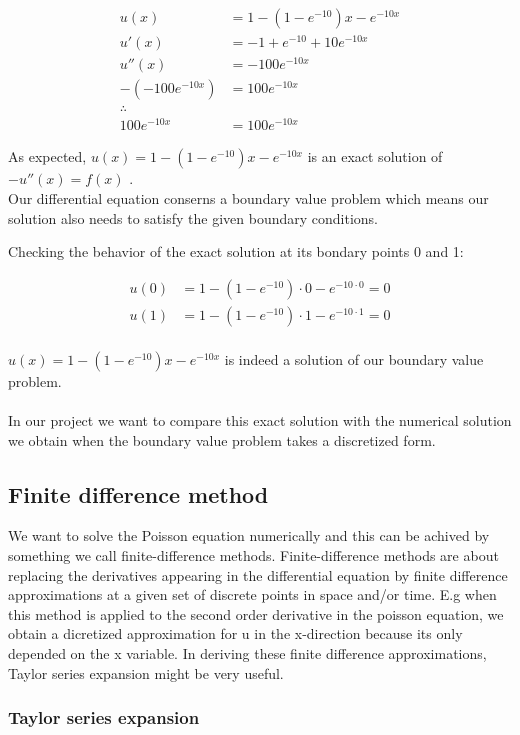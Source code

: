 \documentclass{article}
\begin{document}
\begin{align*}
u(x)& = 1 - (1-e^{-10})x - e^{-10x}  \\
u'(x)& = -1 + e^{-10} + 10e^{-10x} \\
u''(x)& = -100e^{-10x}  \\
-(-100e^{-10x})& = 100e^{-10x} \\
\therefore \\
100e^{-10x}& = 100e^{-10x}
\end{align*}

As expected, $u(x) = 1 - (1-e^{-10})x - e^{-10x}$ is an exact solution of $-u''(x) = f(x)$ .\\

Our differential equation conserns a boundary value problem which means our solution also needs to satisfy the given boundary conditions. 

Checking the behavior of the exact solution at its bondary points 0 and 1: 

\begin{align*}
u(0)& = 1-(1-e^{-10})\cdot 0 -e^{-10\cdot 0} = 0 \\
u(1)& = 1-(1-e^{-10})\cdot 1 -e^{-10\cdot 1} = 0 \\
\end{align*}

$u(x) = 1 - (1-e^{-10})x - e^{-10x}$ is indeed a solution of our boundary value problem. 
\\\\
In our project we want to compare this exact solution with the numerical solution we obtain when the boundary value problem takes a discretized form. 

\subsection{Finite difference method}

We want to solve the Poisson equation numerically and this can be achived by something we call finite-difference methods. Finite-difference methods are about replacing the derivatives appearing in the differential equation by finite difference approximations at a given set of discrete points in space and/or time. E.g when this method is applied to the second order derivative in the poisson equation, we obtain a dicretized approximation for u in the x-direction because its only depended on the x variable. In deriving these finite difference approximations, Taylor series expansion might be very useful.

\subsubsection{Taylor series expansion}
\end{document}
